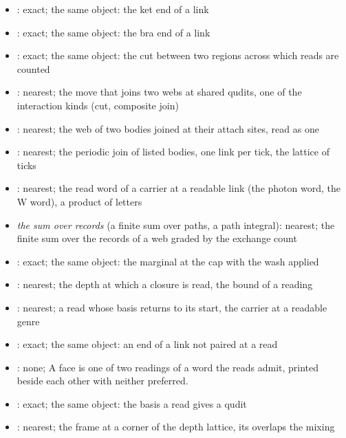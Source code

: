 \begin{chtheorem}
\begin{itemize}
\item {}: exact; the same object: the ket end of a link
\item {}: exact; the same object: the bra end of a link
\item {}: exact; the same object: the cut between two regions across which reads are counted
\item {}: nearest; the move that joins two webs at shared qudits, one of the interaction kinds (cut, composite join)
\item {}: nearest; the web of two bodies joined at their attach sites, read as one
\item {}: nearest; the periodic join of listed bodies, one link per tick, the lattice of ticks
\item {}: nearest; the read word of a carrier at a readable link (the photon word, the W word), a product of letters
\item \emph{the sum over records} (a finite sum over paths, a path integral): nearest; the finite sum over the records of a web graded by the exchange count
\item {}: exact; the same object: the marginal at the cap with the wash applied
\item {}: nearest; the depth at which a closure is read, the bound of a reading
\item {}: nearest; a read whose basis returns to its start, the carrier at a readable genre
\item {}: exact; the same object: an end of a link not paired at a read
\item {}: none; A face is one of two readings of a word the reads admit, printed beside each other with neither preferred.
\item {}: exact; the same object: the basis a read gives a qudit
\item {}: nearest; the frame at a corner of the depth lattice, its overlaps the mixing

\end{itemize}
\end{chtheorem}

